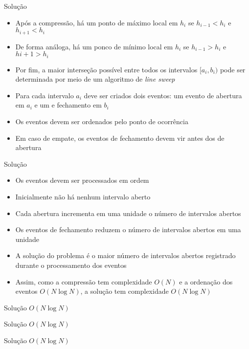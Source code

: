 \begin{frame}[fragile]{Solução}

    \begin{itemize}
        \item Após a compressão, há um ponto de máximo local em $h_i$ se $h_{i - 1} < h_i$ e
            $h_{i + 1} < h_i$

        \item De forma análoga, há um ponco de mínimo local em $h_i$ se $h_{i - 1} > h_i$ e
            $h{i + 1} > h_i$

        \item Por fim, a maior interseção possível entre todos os intervalos $[a_i, b_i)$ pode
            ser determinada por meio de um algoritmo de \textit{line sweep}

        \item Para cada intervalo $a_i$ deve ser criados dois eventos: um evento de abertura em
            $a_i$ e um e fechamento em $b_i$

        \item Os eventos devem ser ordenados pelo ponto de ocorrência

        \item Em caso de empate, os eventos de fechamento devem vir antes dos de abertura

    \end{itemize}

\end{frame}

\begin{frame}[fragile]{Solução}

    \begin{itemize}
        \item Os eventos devem ser processados em ordem

        \item Inicialmente não há nenhum intervalo aberto

        \item Cada abertura incrementa em uma unidade o número de intervalos abertos

        \item Os eventos de fechamento reduzem o número de intervalos abertos em uma unidade

        \item A solução do problema é o maior número de intervalos abertos registrado durante
            o processamento dos eventos

        \item Assim, como a compressão tem complexidade $O(N)$ e a ordenação dos eventos
            $O(N\log N)$, a solução tem complexidade $O(N\log N)$
    \end{itemize}

\end{frame}
\begin{frame}[fragile]{Solução $O(N\log N)$}
\end{frame}

\begin{frame}[fragile]{Solução $O(N\log N)$}
\end{frame}

\begin{frame}[fragile]{Solução $O(N\log N)$}
\end{frame}

